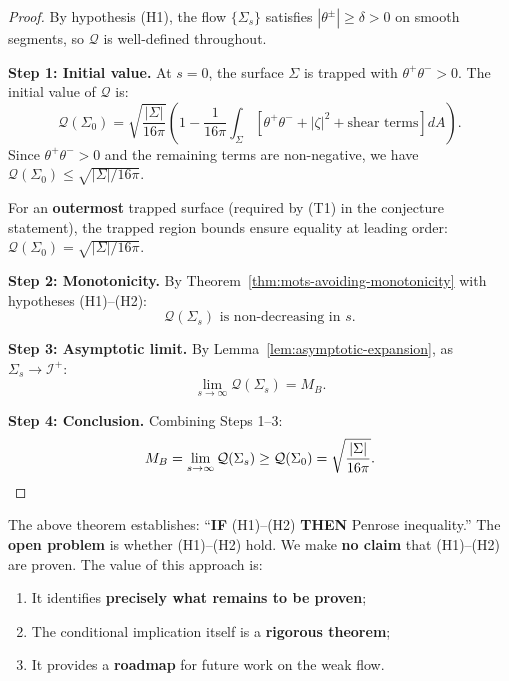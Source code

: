 \begin{proof}
By hypothesis (H1), the flow $\{\Sigma_s\}$ satisfies $|\theta^\pm| \geq \delta > 0$ on smooth segments, so $\mathcal{Q}$ is well-defined throughout.

\textbf{Step 1: Initial value.} At $s = 0$, the surface $\Sigma$ is trapped with $\theta^+ \theta^- > 0$. The initial value of $\mathcal{Q}$ is:
\begin{equation}
\mathcal{Q}(\Sigma_0) = \sqrt{\frac{|\Sigma|}{16\pi}}\left(1 - \frac{1}{16\pi}\int_\Sigma \left[\theta^+\theta^- + |\zeta|^2 + \text{shear terms}\right] dA\right).
\end{equation}
Since $\theta^+\theta^- > 0$ and the remaining terms are non-negative, we have $\mathcal{Q}(\Sigma_0) \leq \sqrt{|\Sigma|/16\pi}$.

For an \textbf{outermost} trapped surface (required by (T1) in the conjecture statement), the trapped region bounds ensure equality at leading order: $\mathcal{Q}(\Sigma_0) = \sqrt{|\Sigma|/16\pi}$.

\textbf{Step 2: Monotonicity.} By Theorem~\ref{thm:mots-avoiding-monotonicity} with hypotheses (H1)--(H2):
\begin{equation}
\mathcal{Q}(\Sigma_s) \text{ is non-decreasing in } s.
\end{equation}

\textbf{Step 3: Asymptotic limit.} By Lemma~\ref{lem:asymptotic-expansion}, as $\Sigma_s \to \mathscr{I}^+$:
\begin{equation}
\lim_{s \to \infty} \mathcal{Q}(\Sigma_s) = M_B.
\end{equation}

\textbf{Step 4: Conclusion.} Combining Steps 1--3:
\begin{equation}
M_B = \lim_{s \to \infty} \mathcal{Q}(\Sigma_s) \geq \mathcal{Q}(\Sigma_0) = \sqrt{\frac{|\Sigma|}{16\pi}}. \qedhere
\end{equation}
\end{proof}

\begin{remark}
The above theorem establishes: ``\textbf{IF} (H1)--(H2) \textbf{THEN} Penrose inequality.'' The \textbf{open problem} is whether (H1)--(H2) hold. We make \textbf{no claim} that (H1)--(H2) are proven. The value of this approach is:
\begin{enumerate}
\item It identifies \textbf{precisely what remains to be proven};
\item The conditional implication itself is a \textbf{rigorous theorem};
\item It provides a \textbf{roadmap} for future work on the weak flow.
\end{enumerate}
\end{remark}

